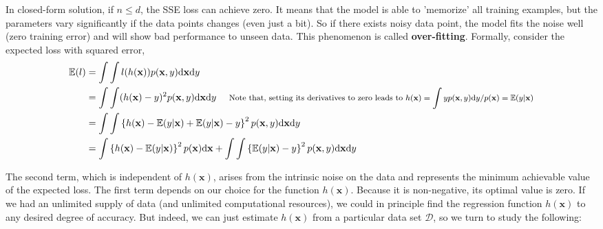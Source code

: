 \documentclass{article}
\begin{document}
	In closed-form solution, if $n\leq d$, the SSE loss can achieve zero. It means that the model is able to 'memorize' all training examples, but the parameters vary significantly if the data points changes (even just a bit). So if there exists noisy data point, the model fits the noise well (zero training error) and will show bad performance to unseen data. This phenomenon is called \textbf{over-fitting}. Formally, consider the expected loss with squared error,
	\begin{equation*}
	\begin{split}
	\mathbb{E}(l) &= \int \int l(h(\mathbf{x})) p(\mathbf{x}, y) \text{d} \mathbf{x} \text{d}y \\
	&= \int \int (h(\mathbf{x})-y)^2 p(\mathbf{x}, y) \text{d} \mathbf{x} \text{d}y
	\ \ \ \ \footnotesize{\text{Note that, setting its derivatives to zero leads to $h(\mathbf{x}) = \int yp(\mathbf{x}, y) \text{d} y /p(\mathbf{x}) = \mathbb{E}(y|\mathbf{x})$}}\\
	&= \int \int \left\{ h(\mathbf{x}) - \mathbb{E} (y|\mathbf{x}) + \mathbb{E} (y|\mathbf{x}) - y \right\}^2 p(\mathbf{x}, y) \text{d} \mathbf{x} \text{d}y \\
	&= \int \left\{ h(\mathbf{x}) - \mathbb{E} (y|\mathbf{x}) \right\}^2 p(\mathbf{x}) \text{d} \mathbf{x} + \int \int \left\{\mathbb{E} (y|\mathbf{x}) - y \right\}^2 p(\mathbf{x}, y) \text{d} \mathbf{x} \text{d} y
	\end{split}
	\end{equation*}
	
	The second term, which is independent of $h(\mathbf{x})$, arises from the intrinsic noise on the data and represents the minimum achievable value of the expected loss. The first term depends on our choice for the function $h(\mathbf{x})$. Because it is non-negative, its optimal value is zero. If we had an unlimited supply of data (and unlimited computational resources), we could in principle find the regression function $h(\mathbf{x})$ to any desired degree of accuracy. But indeed, we can just estimate $h(\mathbf{x})$ from a particular data set $\mathcal{D}$, so we turn to study the following:
	
\end{document}
